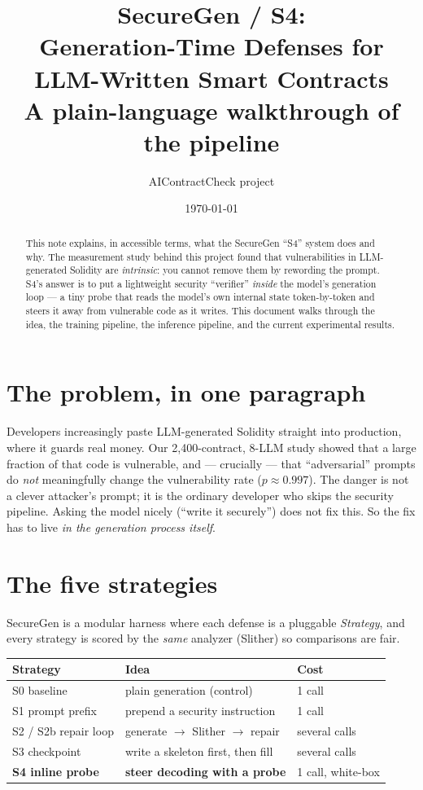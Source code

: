 \documentclass[11pt]{article}
\title{\textbf{SecureGen / S4:\\ Generation-Time Defenses for LLM-Written Smart Contracts}\\[4pt]
\large A plain-language walkthrough of the pipeline}
\author{AIContractCheck project}
\date{\today}
\begin{document}
\maketitle

\begin{abstract}
\noindent This note explains, in accessible terms, what the SecureGen ``S4''
system does and why. The measurement study behind this project found that
vulnerabilities in LLM-generated Solidity are \emph{intrinsic}: you cannot remove
them by rewording the prompt. S4's answer is to put a lightweight security
``verifier'' \emph{inside} the model's generation loop --- a tiny probe that reads
the model's own internal state token-by-token and steers it away from vulnerable
code as it writes. This document walks through the idea, the training pipeline,
the inference pipeline, and the current experimental results.
\end{abstract}

\section{The problem, in one paragraph}
Developers increasingly paste LLM-generated Solidity straight into production,
where it guards real money. Our 2{,}400-contract, 8-LLM study showed that a large
fraction of that code is vulnerable, and --- crucially --- that ``adversarial''
prompts do \emph{not} meaningfully change the vulnerability rate ($p\approx0.997$).
The danger is not a clever attacker's prompt; it is the ordinary developer who
skips the security pipeline. Asking the model nicely (``write it securely'')
does not fix this. So the fix has to live \emph{in the generation process itself}.

\section{The five strategies}
SecureGen is a modular harness where each defense is a pluggable
\emph{Strategy}, and every strategy is scored by the \emph{same} analyzer
(Slither) so comparisons are fair.

\begin{center}
\begin{tabular}{@{}lll@{}}
\toprule
\textbf{Strategy} & \textbf{Idea} & \textbf{Cost} \\
\midrule
S0 baseline & plain generation (control) & 1 call \\
S1 prompt prefix & prepend a security instruction & 1 call \\
S2 / S2b repair loop & generate $\rightarrow$ Slither $\rightarrow$ repair & several calls \\
S3 checkpoint & write a skeleton first, then fill & several calls \\
\textbf{S4 inline probe} & \textbf{steer decoding with a probe} & 1 call, white-box \\
\bottomrule
\end{tabular}
\end{center}
\end{document}
